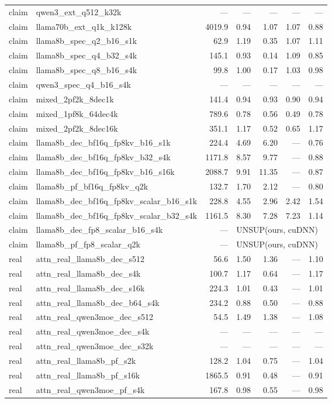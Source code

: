 \begin{longtable}{@{}llrrrrr@{}}
claim & qwen3\_ext\_q512\_k32k & --- & --- & --- & --- & --- \\
claim & llama70b\_ext\_q1k\_k128k & 4019.9 & 0.94 & 1.07 & 1.07 & 0.88 \\
claim & llama8b\_spec\_q2\_b16\_s1k & 62.9 & 1.19 & 0.35 & 1.07 & 1.11 \\
claim & llama8b\_spec\_q4\_b32\_s4k & 145.1 & 0.93 & 0.14 & 1.09 & 0.85 \\
claim & llama8b\_spec\_q8\_b16\_s4k & 99.8 & 1.00 & 0.17 & 1.03 & 0.98 \\
claim & qwen3\_spec\_q4\_b16\_s4k & --- & --- & --- & --- & --- \\
claim & mixed\_2pf2k\_8dec1k & 141.4 & 0.94 & 0.93 & 0.90 & 0.94 \\
claim & mixed\_1pf8k\_64dec4k & 789.6 & 0.78 & 0.56 & 0.49 & 0.78 \\
claim & mixed\_2pf2k\_8dec16k & 351.1 & 1.17 & 0.52 & 0.65 & 1.17 \\
claim & llama8b\_dec\_bf16q\_fp8kv\_b16\_s1k & 224.4 & 4.69 & 6.20 & --- & 0.76 \\
claim & llama8b\_dec\_bf16q\_fp8kv\_b32\_s4k & 1171.8 & 8.57 & 9.77 & --- & 0.88 \\
claim & llama8b\_dec\_bf16q\_fp8kv\_b16\_s16k & 2088.7 & 9.91 & 11.35 & --- & 0.87 \\
claim & llama8b\_pf\_bf16q\_fp8kv\_q2k & 132.7 & 1.70 & 2.12 & --- & 0.80 \\
claim & llama8b\_dec\_bf16q\_fp8kv\_scalar\_b16\_s1k & 228.8 & 4.55 & 2.96 & 2.42 & 1.54 \\
claim & llama8b\_dec\_bf16q\_fp8kv\_scalar\_b32\_s4k & 1161.5 & 8.30 & 7.28 & 7.23 & 1.14 \\
claim & llama8b\_dec\_fp8\_scalar\_b16\_s4k & --- & \multicolumn{4}{l}{UNSUP({ours, cuDNN})} \\
claim & llama8b\_pf\_fp8\_scalar\_q2k & --- & \multicolumn{4}{l}{UNSUP({ours, cuDNN})} \\
real & attn\_real\_llama8b\_dec\_s512 & 56.6 & 1.50 & 1.36 & --- & 1.10 \\
real & attn\_real\_llama8b\_dec\_s4k & 100.7 & 1.17 & 0.64 & --- & 1.17 \\
real & attn\_real\_llama8b\_dec\_s16k & 224.3 & 1.01 & 0.43 & --- & 1.01 \\
real & attn\_real\_llama8b\_dec\_b64\_s4k & 234.2 & 0.88 & 0.50 & --- & 0.88 \\
real & attn\_real\_qwen3moe\_dec\_s512 & 54.5 & 1.49 & 1.38 & --- & 1.08 \\
real & attn\_real\_qwen3moe\_dec\_s4k & --- & --- & --- & --- & --- \\
real & attn\_real\_qwen3moe\_dec\_s32k & --- & --- & --- & --- & --- \\
real & attn\_real\_llama8b\_pf\_s2k & 128.2 & 1.04 & 0.75 & --- & 1.04 \\
real & attn\_real\_llama8b\_pf\_s16k & 1865.5 & 0.91 & 0.48 & --- & 0.91 \\
real & attn\_real\_qwen3moe\_pf\_s4k & 167.8 & 0.98 & 0.55 & --- & 0.98 \\
\end{longtable}
